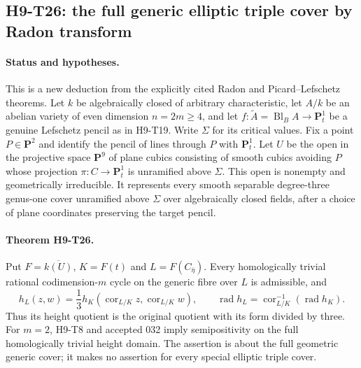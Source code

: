 \subsection{H9-T26: the full generic elliptic triple cover by Radon transform}
\label{h9:T26}

\paragraph{Status and hypotheses.}
This is a new deduction from the explicitly cited Radon and
Picard--Lefschetz theorems. Let $k$ be algebraically closed of
arbitrary characteristic, let $A/k$ be an abelian variety of
even dimension $n=2m\ge4$, and let
$f:\widetilde A=\operatorname{Bl}_B A\to\mathbf P^1_t$
be a genuine Lefschetz pencil as in H9-T19. Write $\Sigma$
for its critical values. Fix a point $P\in\mathbf P^2$ and
identify the pencil of lines through $P$ with $\mathbf P^1_t$.
Let $U$ be the open in the projective space $\mathbf P^9$ of
plane cubics consisting of smooth cubics avoiding $P$ whose
projection $\pi:C\to\mathbf P^1_t$ is unramified above
$\Sigma$. This open is nonempty and geometrically irreducible.
It represents every smooth separable degree-three genus-one
cover unramified above $\Sigma$ over algebraically closed fields,
after a choice of
plane coordinates preserving the target pencil.

\paragraph{Theorem H9-T26.}
Put $F=\overline{k(U)}$, $K=F(t)$ and
$L=F(C_{\overline\eta})$. Every homologically trivial rational
codimension-$m$ cycle on the generic fibre over $L$ is admissible,
and
\[
 h_L(z,w)=\frac13h_K(\operatorname{cor}_{L/K}z,
                             \operatorname{cor}_{L/K}w),\qquad
 \operatorname{rad}h_L=
     \operatorname{cor}_{L/K}^{-1}(\operatorname{rad}h_K).
                                                               \tag{H9.159}
\]
Thus its height quotient is the original quotient with its
form divided by three. For $m=2$, H9-T8 and accepted 032 imply
semipositivity on the full homologically trivial height domain.
The assertion is about the full geometric generic cover;
it makes no assertion for every special elliptic triple cover.

